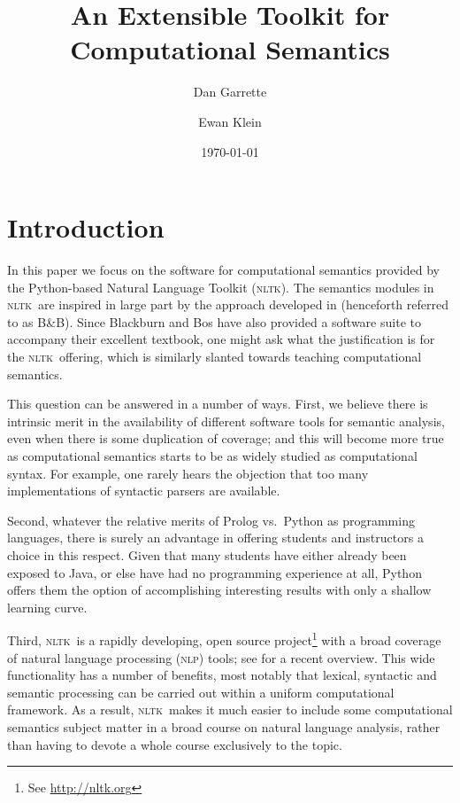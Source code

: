 \documentclass[11pt, a4paper]{article}
\newcommand{\BB}{\textsc{B{\small\&}B}}
\newcommand{\NLP}{\textsc{nlp}}
\newcommand{\NLTK}{\textsc{nltk}}
\begin{document}
\title{An Extensible Toolkit for Computational Semantics}
\author{Dan Garrette \and Ewan Klein}
\date{\today}

\maketitle

\section{Introduction}

In this paper we focus on the software for computational semantics provided
by the Python-based Natural Language Toolkit (\NLTK). The semantics
modules in \NLTK\ are
inspired in large part by the approach developed in \citet{BB}
(henceforth referred to as \BB).
Since Blackburn and Bos have also provided a software suite to
accompany their excellent textbook, one might ask what the
justification is for the \NLTK\ offering, which is similarly slanted
towards teaching computational semantics.

This question can be answered in a number of ways. First, we believe
there is intrinsic merit in the availability of different software
tools for semantic analysis, even when there is some duplication of
coverage; and this will become more true as computational semantics
starts to be as widely studied as computational syntax. For example, 
one rarely hears the objection that too many implementations of 
syntactic parsers are available.

Second, whatever the relative merits of Prolog vs.\ Python as
programming languages, there is surely an advantage in offering
students and instructors a choice in this respect. Given that many
students have either already been exposed to Java, or else have had no
programming experience at all, Python offers them the option of
accomplishing interesting results with only a shallow
learning curve.

Third, \NLTK\ is a rapidly developing, open source
project\footnote{See \url{http://nltk.org}} with a broad coverage of
natural language processing (\NLP) tools; see \citet{Multidisciplinary} for
a recent overview. This wide functionality has a number of benefits,
most notably that lexical, syntactic and semantic processing can be
carried out within a uniform computational framework. As a result,
\NLTK\ makes it much easier to include some computational semantics
subject matter in
a broad course on natural language analysis, rather than having to
devote a whole course exclusively to the topic.
\end{document}
